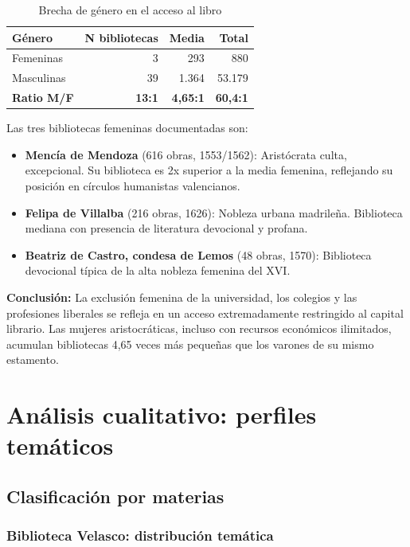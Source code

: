 \documentclass[12pt,a4paper]{article}
\begin{document}
\begin{table}[h]
\centering
\begin{tabular}{lrrr}
\toprule
\textbf{Género} & \textbf{N bibliotecas} & \textbf{Media} & \textbf{Total} \\
\midrule
Femeninas & 3 & 293 & 880 \\
Masculinas & 39 & 1.364 & 53.179 \\
\midrule
\textbf{Ratio M/F} & \textbf{13:1} & \textbf{4,65:1} & \textbf{60,4:1} \\
\bottomrule
\end{tabular}
\caption{Brecha de género en el acceso al libro}
\end{table}

Las tres bibliotecas femeninas documentadas son:

\begin{itemize}
\item \textbf{Mencía de Mendoza} (616 obras, 1553/1562): Aristócrata culta, excepcional. Su biblioteca es 2x superior a la media femenina, reflejando su posición en círculos humanistas valencianos.

\item \textbf{Felipa de Villalba} (216 obras, 1626): Nobleza urbana madrileña. Biblioteca mediana con presencia de literatura devocional y profana.

\item \textbf{Beatriz de Castro, condesa de Lemos} (48 obras, 1570): Biblioteca devocional típica de la alta nobleza femenina del XVI.
\end{itemize}

\textbf{Conclusión:} La exclusión femenina de la universidad, los colegios y las profesiones liberales se refleja en un acceso extremadamente restringido al capital librario. Las mujeres aristocráticas, incluso con recursos económicos ilimitados, acumulan bibliotecas 4,65 veces más pequeñas que los varones de su mismo estamento.

\section{Análisis cualitativo: perfiles temáticos}

\subsection{Clasificación por materias}

\subsubsection{Biblioteca Velasco: distribución temática}
\end{document}
